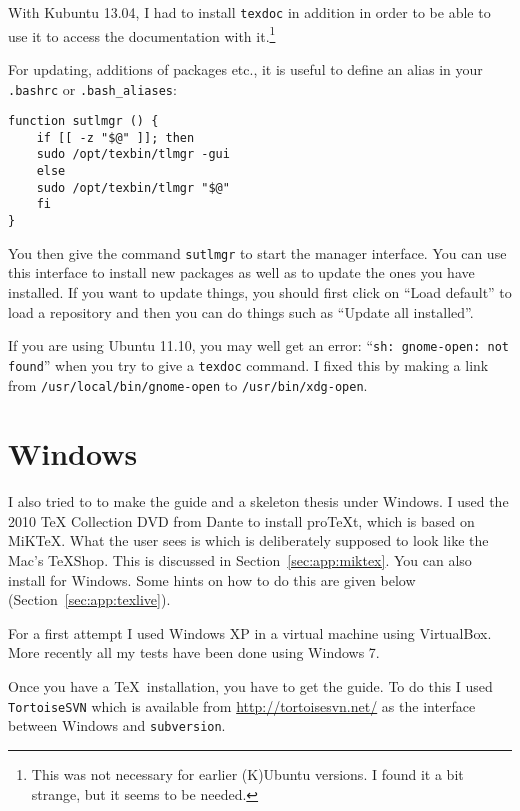 With Kubuntu 13.04, I had to install \texttt{texdoc} in addition in
order to be able to use it to access the documentation with
it.\footnote{This was not necessary for earlier (K)Ubuntu versions. I
  found it a bit strange, but it seems to be needed.}

For updating, additions of packages etc., it is useful to define an
alias in your \texttt{.bashrc} or \texttt{.bash\_aliases}:
\begin{verbatim}
function sutlmgr () {
    if [[ -z "$@" ]]; then
	sudo /opt/texbin/tlmgr -gui
    else
	sudo /opt/texbin/tlmgr "$@"
    fi
}
\end{verbatim}
You then give the command \texttt{sutlmgr} to start the \TeXLive
manager interface. You can use this interface to install new packages
as well as to update the ones you have installed. If you want to
update things, you should first click on \enquote{Load default} to
load a repository and then you can do things such as \enquote{Update
  all installed}.

If you are using Ubuntu 11.10, you may well get an error:
\enquote{\texttt{sh: gnome-open: not found}} when you try to give a
\texttt{texdoc} command. I fixed this by making a
link from \texttt{/usr/local/bin/gnome-open} to
\texttt{/usr/bin/xdg-open}.



\section{Windows}
\label{sec:app:windows}

I also tried to to make the guide and a skeleton thesis under
Windows. I used the 2010 \TeX{} Collection DVD from Dante to install
pro\TeX t, which is based on MiK\TeX. What the user sees is \TeXworks
which is deliberately supposed to look like the Mac's \TeX Shop. This
is discussed in Section~\ref{sec:app:miktex}.
You can also install \TeXLive for Windows. Some hints on how to do
this are given below (Section~\ref{sec:app:texlive}).

For a first attempt I used Windows XP in a virtual machine using
VirtualBox. More recently all my tests have been done using Windows 7.

Once you have a \TeX\ installation, you have to get the guide. To do
this I used \texttt{TortoiseSVN} which is available from
\url{http://tortoisesvn.net/} as the interface between Windows and
\texttt{subversion}.

